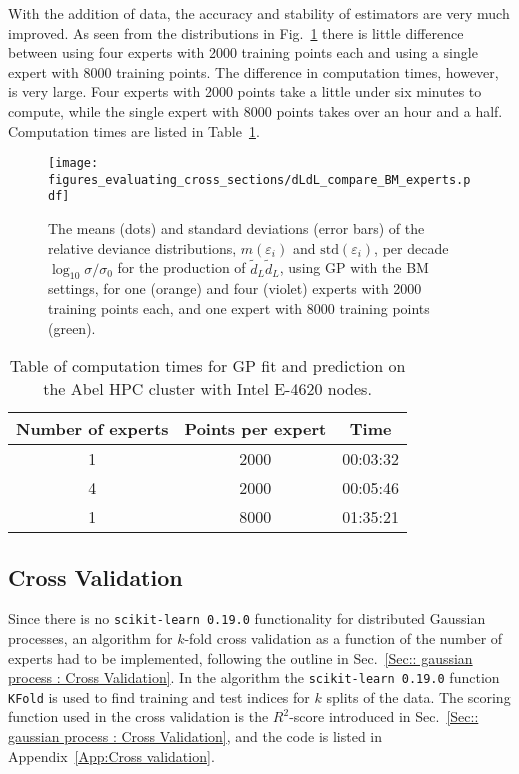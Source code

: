 \documentclass[twoside,english]{uiofysmaster}
\begin{document}
{{With the addition of data, the accuracy and stability of estimators are very much improved. As seen from the distributions in Fig.~\ref{Fig:: evaluating cross : compare 1 vs 4 expert dLdL} there is little difference between using four experts with 2000 training points each and using a single expert with 8000 training points. The difference in computation times, however, is very large. Four experts with 2000 points take a little under six minutes to compute, while the single expert with 8000 points takes over an hour and a half. Computation times are listed in Table~\ref{Tab:: evaluating cross : computation times experts BM}.

\begin{figure}
\centering
\texttt{[image: figures\_evaluating\_cross\_sections/dLdL\_compare\_BM\_experts.pdf]}
\caption{The means (dots) and standard deviations (error bars) of the relative deviance distributions, $m(\varepsilon_i)$ and $\mathrm{std}(\varepsilon_i)$, per decade $\log_{10} \sigma / \sigma_0$ for the production of $\widetilde{d}_L \widetilde{d}_L$, using GP with the BM settings, for one (orange) and four (violet) experts with 2000 training points each, and one expert with 8000 training points (green).}
\label{Fig:: evaluating cross : compare 1 vs 4 expert dLdL}
\end{figure}  

\begin{table}
\centering
\begin{tabular}{@{}ccc@{}} \toprule
Number of experts & Points per expert & Time\\
\midrule
1 & 2000 & 00:03:32\\
4 & 2000 & 00:05:46\\
1 & 8000 & 01:35:21\\ \bottomrule
\end{tabular}
\caption{Table of computation times for GP fit and prediction on the Abel HPC cluster with Intel E-4620 nodes.}
\label{Tab:: evaluating cross : computation times experts BM}
\end{table}


\subsection{Cross Validation}

Since there is no \verb|scikit-learn 0.19.0| functionality for distributed Gaussian processes, an algorithm for $k$-fold cross validation as a function of the number of experts had to be implemented, following the outline in Sec.~\ref{Sec:: gaussian process : Cross Validation}. In the algorithm the \verb|scikit-learn 0.19.0| function \verb|KFold| is used to find training and test indices for $k$ splits of the data. The scoring function used in the cross validation is the $R^2$-score introduced in Sec.~\ref{Sec:: gaussian process : Cross Validation}, and the code is listed in Appendix~\ref{App:Cross validation}. 


}}
\end{document}

